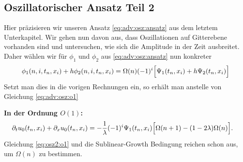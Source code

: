 \subsection {Oszillatorischer Ansatz Teil 2}\label{sec:osz2}

Hier präzisieren wir unseren Ansatz \eqref{eq:adv:osz:ansatz} aus dem letztem Unterkapitel. %
Wir gehen nun davon aus, dass Oszillationen auf Gitterebene vorhanden sind und untersuchen, wie sich die Amplitude in der Zeit ausbreitet.
Daher wählen wir für $\phi_1$ und $\phi_2$ aus \eqref{eq:adv:osz:ansatz} nun konkreter 
\[ 
\phi_1(n, i, t_n, x_i) + h \phi_2(n, i, t_n, x_i) 
= \Omega(n) (-1)^i \Bigl[ \Psi_1(t_n, x_i) + h \Psi_2(t_n, x_i) \Bigr]
\]
Setzt man dies in die vorigen Rechnungen ein, so erhält man anstelle von Gleichung \eqref{eq:adv:osz:o1}

\vspace{0.4cm}
\noindent \textbf{In der Ordnung $O(1)$:}
\begin{align}\label{eq:osz2:o1} %
\partial_t u_0(t_n, x_i) + \partial_x u_0(t_n, x_i) %
&= - \frac 1 \lambda (-1)^i \Psi_1(t_n, x_i) \Bigl[ \Omega(n+1) - ( 1 - 2 \lambda ) \Omega(n) \Bigr].
\end{align}
Gleichung \eqref{eq:osz2:o1} und die Sublinear-Growth Bedingung reichen schon aus, um $\Omega(n)$ zu bestimmen.

